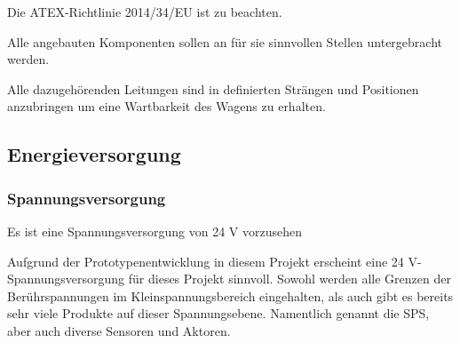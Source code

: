 \begin{feat}
Die ATEX-Richtlinie 2014/34/EU ist zu beachten.
\end{feat}
\begin{feat}
Alle angebauten Komponenten sollen an für sie sinnvollen Stellen untergebracht werden.
\end{feat}
\begin{rem}[zu Anf. 09]
Alle dazugehörenden Leitungen sind in definierten Strängen und Positionen anzubringen um eine Wartbarkeit des Wagens zu erhalten.
\end{rem}

\subsection{Energieversorgung}\label{sec:EV}
\subsubsection{Spannungsversorgung}
\begin{feat}
Es ist eine Spannungsversorgung von 24 V vorzusehen
\end{feat}
\begin{rem}[zu Anf. 10]
Aufgrund der Prototypenentwicklung in diesem Projekt erscheint eine 24 V-Spannungsversorgung für dieses Projekt sinnvoll. Sowohl werden alle Grenzen der Berührspannungen im Kleinspannungsbereich eingehalten, als auch gibt es bereits sehr viele Produkte auf dieser Spannungsebene. Namentlich genannt die SPS, aber auch diverse Sensoren und Aktoren.
\end{rem}

